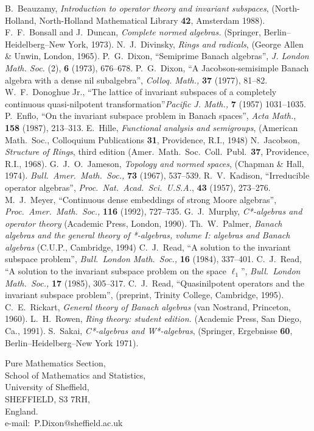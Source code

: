 \documentclass[11pt]{article}
\begin{document}
\begin{thebibliography}{99}
 B.~Beauzamy, {\em Introduction to operator theory and
invariant subspaces}, (North-Holland, North-Holland Mathematical Library {\bf
42}, Amsterdam 1988).
 F.~F.~Bonsall and J.~Duncan, {\em Complete normed algebras.}
(Springer, Berlin--Heidelberg--New York, 1973).
 N.~J.~Divinsky, {\em Rings and radicals}, (George Allen
\& Unwin, London, 1965).
  P.~G.~Dixon, ``Semiprime Banach algebras'', {\em J. London Math. Soc.} (2),
{\bf 6} (1973), 676--678.
 P.~G.~Dixon, ``A Jacobson-semisimple Banach algebra with a dense nil
subalgebra'', {\em Colloq. Math.,} {\bf 37} (1977), 81--82.
 W.~F.~Donoghue Jr., ``The lattice of invariant subspaces of
a completely continuous quasi-nilpotent transformation''{\em Pacific J. Math.,} {\bf 7} (1957)
1031--1035.  %
 P.~Enflo, ``On the invariant subspace problem in Banach spaces'',
{\em Acta Math.}, {\bf 158} (1987), 213--313. %
 E.~Hille, {\em Functional analysis and semigroups},
(American Math.\ Soc., Colloquium Publications {\bf 31}, Providence, R.I., 1948)
 N.~Jacobson, {\em Structure of Rings}, third edition
(Amer.\ Math.\ Soc.\ Coll.\ Publ.\ {\bf 37}, Providence, R.I., 1968).
 G.~J.~O.~Jameson, {\em Topology and normed spaces},
(Chapman \& Hall, 1974).
{\em Bull.\ Amer.\ Math.\ Soc.,} {\bf 73} (1967), 537--539. %
 R.~V.~Kadison, ``Irreducible operator algebras'',
{\em Proc.\ Nat.\ Acad.\ Sci.\ U.S.A.}, {\bf 43} (1957), 273--276.
 M.~J.~Meyer, ``Continuous dense embeddings of strong Moore
algebras'', {\em Proc.\ Amer.\ Math.\ Soc.,} {\bf 116} (1992), 727--735.
 G.~J.~Murphy, {\em C*-algebras and operator theory}
(Academic Press, London, 1990).
 Th.~W.~Palmer, {\em Banach algebras and the general theory of *-algebras,
volume I: algebras and Banach algebras} (C.U.P., Cambridge, 1994)
 C.~J.~Read, ``A solution to the invariant subspace problem'',
{\em Bull.\ London Math.\ Soc.,} {\bf 16} (1984), 337--401. %
 C.~J.~Read, ``A solution to the invariant subspace problem
on the space $\ell_1$'', {\em Bull.\ London Math.\ Soc.,} {\bf 17} (1985),
305--317. %
 C.~J.~Read, ``Quasinilpotent operators and the invariant
subspace problem'', (preprint, Trinity College, Cambridge, 1995).
 C.~E.~Rickart, {\em General theory of Banach algebras}
(van Nostrand, Princeton, 1960).
 L.~H.~Rowen, {\em Ring theory: student edition.}
(Academic Press, San Diego, Ca., 1991).
 S.~Sakai, {\em C*-algebras and W*-algebras},
(Springer, Ergebnisse {\bf 60}, Berlin--Heidelberg--New York 1971).
\end{thebibliography}
\vspace{\baselineskip}

\noindent
Pure Mathematics Section, \\
School of Mathematics and Statistics,\\
University of Sheffield,\\
SHEFFIELD,  S3 7RH,\\
England. \\[1 ex]
e-mail:~P.Dixon@sheffield.ac.uk
\end{document}
